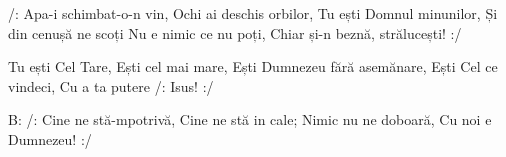 
\beginverse
/: Apa-i schimbat-o-n vin,
Ochi ai deschis orbilor,
Tu ești Domnul minunilor,
Și din cenușă ne scoți
Nu e nimic ce nu poți,
Chiar și-n beznă, strălucești! :/
\endverse

\beginchorus
Tu ești Cel Tare,
Ești cel mai mare,
Ești Dumnezeu fără asemănare,
Ești Cel ce vindeci,
Cu a ta putere /: Isus! :/
\endchorus

\beginverse*
B: /: Cine ne stă-mpotrivă,
Cine ne stă in cale;
Nimic nu ne doboară,
Cu noi e Dumnezeu! :/
\endverse

\endsong